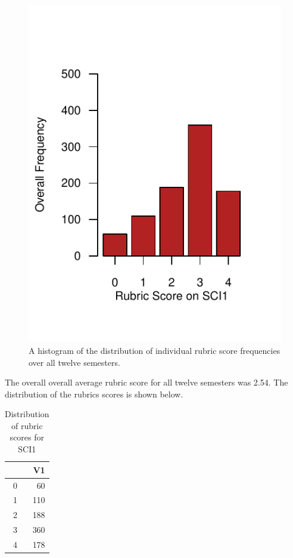 \documentclass[fleqn,10pt]{SelfArx}\usepackage[]{graphicx}\usepackage[]{color}
\begin{document}
\begin{figure}[h]\centering

\includegraphics[width=\columnwidth,viewport = 0 20 216 240]{./figure/histogram}
\protect\caption{A histogram of the distribution of individual rubric score frequencies over all twelve semesters.}
\label{fig:histogram}
\end{figure}
The overall overall average rubric score for all twelve semesters was 2.54. The distribution of the rubrics scores is shown below.
\begin{center}
\begin{table}[ht]
\centering
\caption{Distribution of rubric scores for SCI1} 
\label{tab:distribution}
\begin{tabular}{rr}
  \hline
 & V1 \\ 
  \hline
0 &  60 \\ 
  1 & 110 \\ 
  2 & 188 \\ 
  3 & 360 \\ 
  4 & 178 \\ 
   \hline
\end{tabular}
\end{table}

\end{center}
\end{document}
